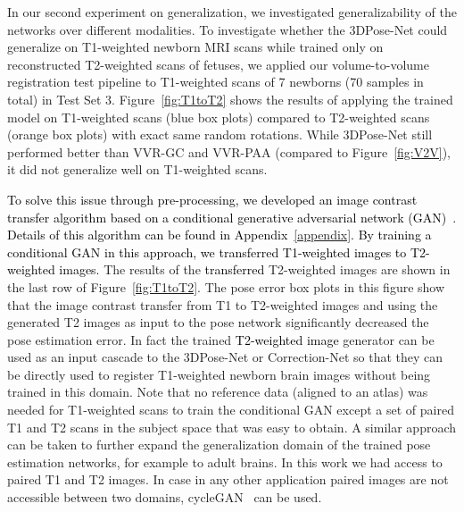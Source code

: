 \documentclass[journal,transmag]{IEEEtran}
\begin{document}
In our second experiment on generalization, we investigated generalizability of the networks over different modalities. To investigate whether the 3DPose-Net could generalize on T1-weighted newborn MRI scans while trained only on reconstructed T2-weighted scans of fetuses, we applied our volume-to-volume registration test pipeline to T1-weighted scans of 7 newborns (70 samples in total) in Test Set 3. Figure~\ref{fig:T1toT2} shows the results of applying the trained model on T1-weighted scans (blue box plots) compared to T2-weighted scans (orange box plots) with exact same random rotations. While 3DPose-Net still performed better than VVR-GC and VVR-PAA (compared to Figure~\ref{fig:V2V}), it did not generalize well on T1-weighted scans.

\textcolor{black}{To solve this issue through pre-processing, we developed an image contrast transfer algorithm based on a conditional generative adversarial network (GAN)~\cite{isola2017image}. Details of this algorithm can be found in Appendix~\ref{appendix}. By training a conditional GAN in this approach, we transferred T1-weighted images to T2-weighted images.} The results of the \textcolor{black}{transferred} T2-weighted images are shown in the last row of Figure~\ref{fig:T1toT2}. The pose error box plots in this figure show that the image contrast transfer from T1 to T2-weighted images and using the generated T2 images as input to the pose network significantly decreased the pose estimation error. In fact the trained \textcolor{black}{T2-weighted image} generator can be used as an input cascade to the 3DPose-Net or Correction-Net so that they can be directly used to register T1-weighted newborn brain images without being trained in this domain. Note that no reference data (aligned to an atlas) was needed for T1-weighted scans to train the conditional GAN except a set of paired T1 and T2 scans in the subject space that was easy to obtain. A similar approach can be taken to further expand the generalization domain of the trained pose estimation networks, for example to adult brains. In this work we had access to paired T1 and T2 images. In case in any other application paired images are not accessible between two domains, cycleGAN~\cite{zhu2017unpaired} can be used.
\end{document}
